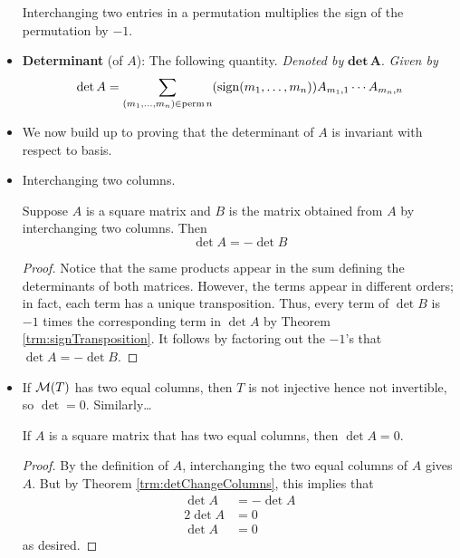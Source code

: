 \documentclass[../main.tex]{subfiles}
\begin{document}
\begin{itemize}
\begin{theorem}
        Interchanging two entries in a permutation multiplies the sign of the permutation by $-1$.
    \end{theorem}
    \item \textbf{Determinant} (of $A$): The following quantity. \emph{Denoted by} $\mathbf{det}\,\bm{A}$. \emph{Given by}
    \begin{equation*}
        \det A = \sum_{(m_1,\dots,m_n)\in\operatorname{perm} n}(\operatorname{sign}(m_1,\dots,m_n))A_{m_1,1}\cdots A_{m_n,n}
    \end{equation*}
    \item We now build up to proving that the determinant of $A$ is invariant with respect to basis.
    \item Interchanging two columns.
    \begin{theorem}\label{trm:detChangeColumns}
        Suppose $A$ is a square matrix and $B$ is the matrix obtained from $A$ by interchanging two columns. Then
        \begin{equation*}
            \det A = -\det B
        \end{equation*}
        \begin{proof}
            Notice that the same products appear in the sum defining the determinants of both matrices. However, the terms appear in different orders; in fact, each term has a unique transposition. Thus, every term of $\det B$ is $-1$ times the corresponding term in $\det A$ by Theorem \ref{trm:signTransposition}. It follows by factoring out the $-1$'s that $\det A=-\det B$.
        \end{proof}
    \end{theorem}
    \item If $\mathcal{M}(T)$ has two equal columns, then $T$ is not injective hence not invertible, so $\det=0$. Similarly\dots
    \begin{theorem}
        If $A$ is a square matrix that has two equal columns, then $\det A=0$.
        \begin{proof}
            By the definition of $A$, interchanging the two equal columns of $A$ gives $A$. But by Theorem \ref{trm:detChangeColumns}, this implies that
            \begin{align*}
                \det A &= -\det A\\
                2\det A &= 0\\
                \det A &= 0
            \end{align*}
            as desired.
        \end{proof}
    \end{theorem}

\end{itemize}
\end{document}
